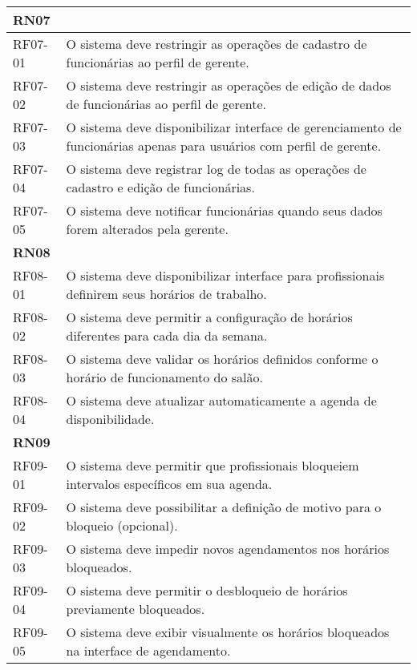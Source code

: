 \begin{longtable}{|p{}|p{}|}
	\multicolumn{2}{|l|}{\textbf{RN07}} \\ \hline
	RF07-01 & O sistema deve restringir as operações de cadastro de funcionárias ao perfil de gerente. \\ \hline
	RF07-02 & O sistema deve restringir as operações de edição de dados de funcionárias ao perfil de gerente. \\ \hline
	RF07-03 & O sistema deve disponibilizar interface de gerenciamento de funcionárias apenas para usuários com perfil de gerente. \\ \hline
	RF07-04 & O sistema deve registrar log de todas as operações de cadastro e edição de funcionárias. \\ \hline
	RF07-05 & O sistema deve notificar funcionárias quando seus dados forem alterados pela gerente. \\ \hline
	
	\multicolumn{2}{|l|}{\textbf{RN08}} \\ \hline
	RF08-01 & O sistema deve disponibilizar interface para profissionais definirem seus horários de trabalho. \\ \hline
	RF08-02 & O sistema deve permitir a configuração de horários diferentes para cada dia da semana. \\ \hline
	RF08-03 & O sistema deve validar os horários definidos conforme o horário de funcionamento do salão. \\ \hline
	RF08-04 & O sistema deve atualizar automaticamente a agenda de disponibilidade. \\ \hline
	
	\multicolumn{2}{|l|}{\textbf{RN09}} \\ \hline
	RF09-01 & O sistema deve permitir que profissionais bloqueiem intervalos específicos em sua agenda. \\ \hline
	RF09-02 & O sistema deve possibilitar a definição de motivo para o bloqueio (opcional). \\ \hline
	RF09-03 & O sistema deve impedir novos agendamentos nos horários bloqueados. \\ \hline
	RF09-04 & O sistema deve permitir o desbloqueio de horários previamente bloqueados. \\ \hline
	RF09-05 & O sistema deve exibir visualmente os horários bloqueados na interface de agendamento. \\ \hline
	

\end{longtable}
